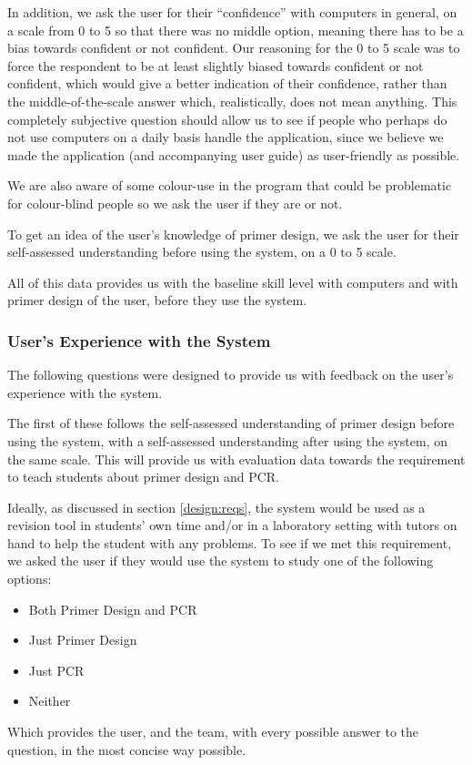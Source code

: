 In addition, we ask the user for their ``confidence'' with computers
in general, on a scale from 0 to 5 so that there was no middle option,
meaning there has to be a bias towards confident or not confident.
Our reasoning for the 0 to 5 scale was to force the respondent to be
at least slightly biased towards confident or not confident, which
would give a better indication of their confidence, rather than the
middle-of-the-scale answer which, realistically, does not mean
anything.
This completely subjective question should allow us to see if people
who perhaps do not use computers on a daily basis handle the
application, since we believe we made the application (and
accompanying user guide) as user-friendly as possible.

We are also aware of some colour-use in the program that could be
problematic for colour-blind people so we ask the user if they are or
not.

To get an idea of the user's knowledge of primer design, we ask the
user for their self-assessed understanding before using the system, on
a 0 to 5 scale.

All of this data provides us with the baseline skill level with
computers and with primer design of the user, before they use the
system.

\subsubsection{User's Experience with the System}
The following questions were designed to provide us with feedback on
the user's experience with the system.

The first of these follows the self-assessed understanding of primer
design before using the system, with a self-assessed understanding
after using the system, on the same scale.
This will provide us with evaluation data towards the requirement to
teach students about primer design and PCR.

Ideally, as discussed in section \ref{design:reqs}, the system would
be used as a revision tool in students' own time and/or in a
laboratory setting with tutors on hand to help the student with any
problems.
To see if we met this requirement, we asked the user if they would use
the system to study one of the following options:
\begin{itemize}
\item Both Primer Design and PCR
\item Just Primer Design
\item Just PCR
\item Neither
\end{itemize}
Which provides the user, and the team, with every possible answer to
the question, in the most concise way possible.

